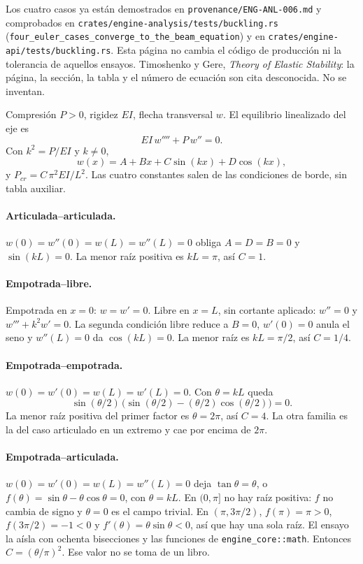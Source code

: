 Los cuatro casos ya están demostrados en \texttt{provenance/ENG-ANL-006.md} y comprobados en \texttt{crates/engine-analysis/tests/buckling.rs} (\texttt{four\_euler\_cases\_converge\_to\_the\_beam\_equation}) y en \texttt{crates/engine-api/tests/buckling.rs}. Esta página no cambia el código de producción ni la tolerancia de aquellos ensayos. Timoshenko y Gere, \emph{Theory of Elastic Stability}: la página, la sección, la tabla y el número de ecuación son cita desconocida. No se inventan.

Compresión \(P>0\), rigidez \(EI\), flecha transversal \(w\). El equilibrio linealizado del eje es
\begin{equation}
EI\,w''''+P\,w''=0.
\label{eq:val038-viga}
\end{equation}
Con \(k^2=P/EI\) y \(k\neq 0\),
\[
w(x)=A+Bx+C\sin(kx)+D\cos(kx),
\]
y \(P_{cr}=C\,\pi^2 EI/L^2\). Las cuatro constantes salen de las condiciones de borde, sin tabla auxiliar.

\paragraph{Articulada--articulada.}
\(w(0)=w''(0)=w(L)=w''(L)=0\) obliga \(A=D=B=0\) y \(\sin(kL)=0\). La menor raíz positiva es \(kL=\pi\), así \(C=1\).

\paragraph{Empotrada--libre.}
Empotrada en \(x=0\): \(w=w'=0\). Libre en \(x=L\), sin cortante aplicado: \(w''=0\) y \(w'''+k^2 w'=0\). La segunda condición libre reduce a \(B=0\), \(w'(0)=0\) anula el seno y \(w''(L)=0\) da \(\cos(kL)=0\). La menor raíz es \(kL=\pi/2\), así \(C=1/4\).

\paragraph{Empotrada--empotrada.}
\(w(0)=w'(0)=w(L)=w'(L)=0\). Con \(\theta=kL\) queda
\[
\sin(\theta/2)\,\bigl(\sin(\theta/2)-(\theta/2)\cos(\theta/2)\bigr)=0.
\]
La menor raíz positiva del primer factor es \(\theta=2\pi\), así \(C=4\). La otra familia es la del caso articulado en un extremo y cae por encima de \(2\pi\).

\paragraph{Empotrada--articulada.}
\(w(0)=w'(0)=w(L)=w''(L)=0\) deja \(\tan\theta=\theta\), o \(f(\theta)=\sin\theta-\theta\cos\theta=0\), con \(\theta=kL\). En \((0,\pi]\) no hay raíz positiva: \(f\) no cambia de signo y \(\theta=0\) es el campo trivial. En \((\pi,3\pi/2)\), \(f(\pi)=\pi>0\), \(f(3\pi/2)=-1<0\) y \(f'(\theta)=\theta\sin\theta<0\), así que hay una sola raíz. El ensayo la aísla con ochenta bisecciones y las funciones de \texttt{engine\_core::math}. Entonces \(C=(\theta/\pi)^2\). Ese valor no se toma de un libro.

